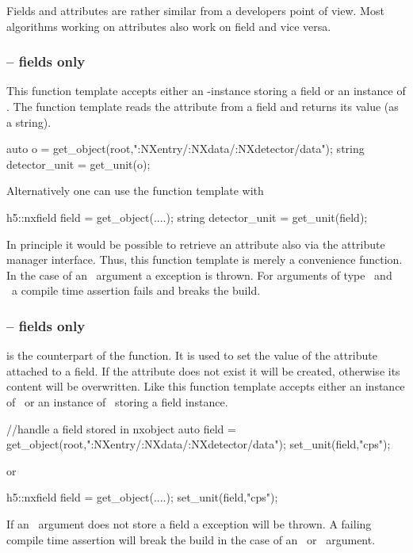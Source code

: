 
Fields and attributes are rather similar from a developers point of view. Most
algorithms working on attributes also work on field and vice versa. 

\subsubsection{ -- fields only}

This function template accepts either an \nxobject-instance storing a field or
an instance of \nxfield. The  function template reads the 
 attribute from a field and returns its value (as a string). 
\begin{cppcode}
auto o = get_object(root,":NXentry/:NXdata/:NXdetector/data");
string detector_unit = get_unit(o);
\end{cppcode}
Alternatively one can use the function template with \nxfield
\begin{cppcode}
h5::nxfield field = get_object(....);
string detector_unit = get_unit(field);
\end{cppcode}
In principle it would be possible to retrieve an attribute also via the
attribute manager interface. Thus, this function template is merely a
convenience function.
In the case of an \nxobject\ argument a  exception is thrown. 
For arguments of type \nxattribute\ and \nxgroup\ a compile time assertion 
fails and breaks the build.

\subsubsection{ -- fields only}

 is the counterpart of the  function. It is used
to set the value of the  attribute attached to a field. 
If the attribute does not exist it will be created, otherwise its content will
be overwritten. Like  this function template accepts either an
instance of \nxfield\ or an instance of \nxobject\ storing a field instance. 
\begin{cppcode}
//handle a field stored in nxobject
auto field = get_object(root,":NXentry/:NXdata/:NXdetector/data");
set_unit(field,"cps");
\end{cppcode}
or
\begin{cppcode}
h5::nxfield field = get_object(....);
set_unit(field,"cps");
\end{cppcode}
If an \nxobject\ argument does not store a field a  exception
will be thrown. A failing compile time assertion will break the build in the 
case of an \nxgroup\ or \nxattribute\ argument.

